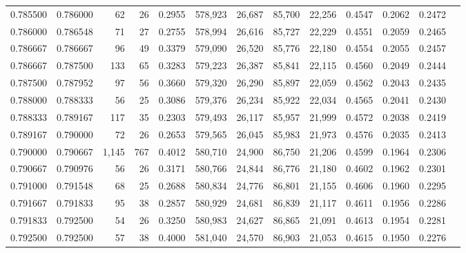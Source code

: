 \begin{tabular}{rrrrrrrrrrrrr}
0.785500 & 0.786000 &    62 &  26 &                                     0.2955 & 578,923 &  26,687 &  85,700 &  22,256 & 0.4547 & 0.2062 & 0.2472 \\
0.786000 & 0.786548 &    71 &  27 &                                     0.2755 & 578,994 &  26,616 &  85,727 &  22,229 & 0.4551 & 0.2059 & 0.2465 \\
0.786667 & 0.786667 &    96 &  49 &                                     0.3379 & 579,090 &  26,520 &  85,776 &  22,180 & 0.4554 & 0.2055 & 0.2457 \\
0.786667 & 0.787500 &   133 &  65 &                                     0.3283 & 579,223 &  26,387 &  85,841 &  22,115 & 0.4560 & 0.2049 & 0.2444 \\
0.787500 & 0.787952 &    97 &  56 &                                     0.3660 & 579,320 &  26,290 &  85,897 &  22,059 & 0.4562 & 0.2043 & 0.2435 \\
0.788000 & 0.788333 &    56 &  25 &                                     0.3086 & 579,376 &  26,234 &  85,922 &  22,034 & 0.4565 & 0.2041 & 0.2430 \\
0.788333 & 0.789167 &   117 &  35 &                                     0.2303 & 579,493 &  26,117 &  85,957 &  21,999 & 0.4572 & 0.2038 & 0.2419 \\
0.789167 & 0.790000 &    72 &  26 &                                     0.2653 & 579,565 &  26,045 &  85,983 &  21,973 & 0.4576 & 0.2035 & 0.2413 \\
0.790000 & 0.790667 & 1,145 & 767 &                                     0.4012 & 580,710 &  24,900 &  86,750 &  21,206 & 0.4599 & 0.1964 & 0.2306 \\
0.790667 & 0.790976 &    56 &  26 &                                     0.3171 & 580,766 &  24,844 &  86,776 &  21,180 & 0.4602 & 0.1962 & 0.2301 \\
0.791000 & 0.791548 &    68 &  25 &                                     0.2688 & 580,834 &  24,776 &  86,801 &  21,155 & 0.4606 & 0.1960 & 0.2295 \\
0.791667 & 0.791833 &    95 &  38 &                                     0.2857 & 580,929 &  24,681 &  86,839 &  21,117 & 0.4611 & 0.1956 & 0.2286 \\
0.791833 & 0.792500 &    54 &  26 &                                     0.3250 & 580,983 &  24,627 &  86,865 &  21,091 & 0.4613 & 0.1954 & 0.2281 \\
0.792500 & 0.792500 &    57 &  38 &                                     0.4000 & 581,040 &  24,570 &  86,903 &  21,053 & 0.4615 & 0.1950 & 0.2276 \\

\end{tabular}
